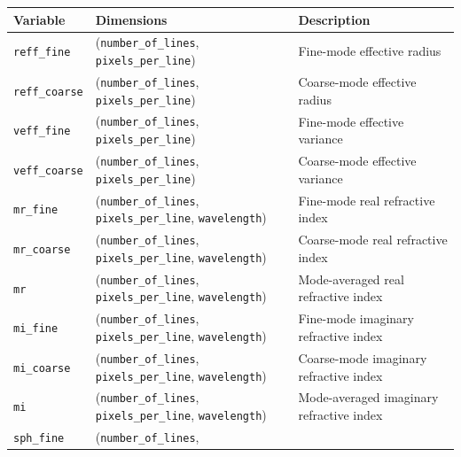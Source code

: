 \documentclass[
  11pt,
  letterpaper,
]{scrreprt}
\begin{document}
\begin{longtable}[]{@{}
  >{\raggedright\arraybackslash}p{}
  >{\raggedright\arraybackslash}p{}
  >{\raggedright\arraybackslash}p{}@{}}
\toprule\noalign{}
\begin{minipage}[b]{\linewidth}\raggedright
Variable
\end{minipage} & \begin{minipage}[b]{\linewidth}\raggedright
Dimensions
\end{minipage} & \begin{minipage}[b]{\linewidth}\raggedright
Description
\end{minipage} \\
\midrule\noalign{}
\endhead
\bottomrule\noalign{}
\endlastfoot
\texttt{reff\_fine} & (\texttt{number\_of\_lines},
\texttt{pixels\_per\_line}) & Fine-mode effective radius \\
\texttt{reff\_coarse} & (\texttt{number\_of\_lines},
\texttt{pixels\_per\_line}) & Coarse-mode effective radius \\
\texttt{veff\_fine} & (\texttt{number\_of\_lines},
\texttt{pixels\_per\_line}) & Fine-mode effective variance \\
\texttt{veff\_coarse} & (\texttt{number\_of\_lines},
\texttt{pixels\_per\_line}) & Coarse-mode effective variance \\
\texttt{mr\_fine} & (\texttt{number\_of\_lines},
\texttt{pixels\_per\_line}, \texttt{wavelength}) & Fine-mode real
refractive index \\
\texttt{mr\_coarse} & (\texttt{number\_of\_lines},
\texttt{pixels\_per\_line}, \texttt{wavelength}) & Coarse-mode real
refractive index \\
\texttt{mr} & (\texttt{number\_of\_lines}, \texttt{pixels\_per\_line},
\texttt{wavelength}) & Mode-averaged real refractive index \\
\texttt{mi\_fine} & (\texttt{number\_of\_lines},
\texttt{pixels\_per\_line}, \texttt{wavelength}) & Fine-mode imaginary
refractive index \\
\texttt{mi\_coarse} & (\texttt{number\_of\_lines},
\texttt{pixels\_per\_line}, \texttt{wavelength}) & Coarse-mode imaginary
refractive index \\
\texttt{mi} & (\texttt{number\_of\_lines}, \texttt{pixels\_per\_line},
\texttt{wavelength}) & Mode-averaged imaginary refractive index \\
\texttt{sph\_fine} & (\texttt{number\_of\_lines},

\end{longtable}
\end{document}
